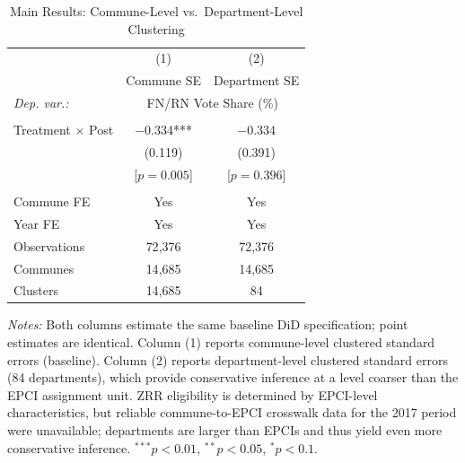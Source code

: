 \begin{table}[htbp]
\centering
\caption{Main Results: Commune-Level vs.\ Department-Level Clustering}
\label{tab:epci_cluster}
\begin{tabular}{lcc}
\toprule
 & (1) & (2) \\
 & Commune SE & Department SE \\
\midrule
\textit{Dep. var.:} & \multicolumn{2}{c}{FN/RN Vote Share (\%)} \\
 & & \\
Treatment $\times$ Post & $-$0.334*** & $-$0.334 \\
 & (0.119) & (0.391) \\
 & [$p = 0.005$] & [$p = 0.396$] \\
 & & \\
Commune FE & Yes & Yes \\
Year FE & Yes & Yes \\
\midrule
Observations & 72{,}376 & 72{,}376 \\
Communes & 14{,}685 & 14{,}685 \\
Clusters & 14{,}685 & 84 \\
\bottomrule
\end{tabular}
\vspace{0.3em}
\parbox{\textwidth}{\footnotesize
\textit{Notes:} Both columns estimate the same baseline DiD specification; point estimates are identical. Column (1) reports commune-level clustered standard errors (baseline). Column (2) reports department-level clustered standard errors (84 departments), which provide conservative inference at a level coarser than the EPCI assignment unit. ZRR eligibility is determined by EPCI-level characteristics, but reliable commune-to-EPCI crosswalk data for the 2017 period were unavailable; departments are larger than EPCIs and thus yield even more conservative inference.
$^{***}p<0.01$, $^{**}p<0.05$, $^{*}p<0.1$.}
\end{table}
